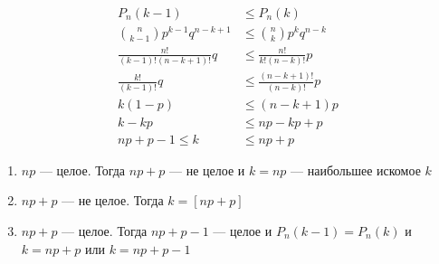 \documentclass[12pt, a4paper, oneside]{book}
\begin{document}
\begin{align*}
    P_n(k - 1)                              & \leq P_n(k)                          \\
    \binom{n}{k - 1} p^{k - 1}q^{n - k + 1} & \leq \binom{n}{k} p^k q^{n - k}      \\
    \frac{n!}{(k - 1)!(n - k + 1)!} q       & \leq \frac{n!}{k!(n - k)!} p         \\
    \frac{k!}{(k - 1)!} q                   & \leq \frac{(n - k + 1)!}{(n - k)!} p \\
    k(1 - p)                                & \leq (n - k + 1) p                   \\
    k - kp                                  & \leq np - kp + p                     \\
    np + p - 1 \leq k                       & \leq np + p
\end{align*}

\begin{enumerate}
    \item \(np\) --- целое. Тогда \(np + p\) --- не целое и \(k = np\) --- наибольшее искомое \(k\)
    \item \(np + p\) --- не целое. Тогда \(k = [np + p]\)
    \item \(np + p\) --- целое. Тогда \(np + p - 1\) --- целое и \(P_n(k - 1) = P_n(k)\) и \(k = np + p\) или \(k = np + p - 1\)
\end{enumerate}
\end{document}
